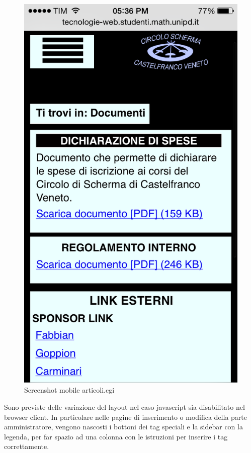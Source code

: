 \begin{itemize}
\begin{figure}[h]
			\includegraphics[scale=0.30]{images/articoli_mobile.png}
			\caption{Screenshot mobile articoli.cgi}
		\end{figure}
	
\end{itemize}
Sono previste delle variazione del layout nel caso javascript sia disabilitato nel browser client. In particolare nelle pagine di inserimento o modifica della parte amministratore, vengono nascosti i bottoni dei tag speciali e la sidebar con la legenda, per far spazio ad una colonna con le istruzioni per inserire i tag correttamente.